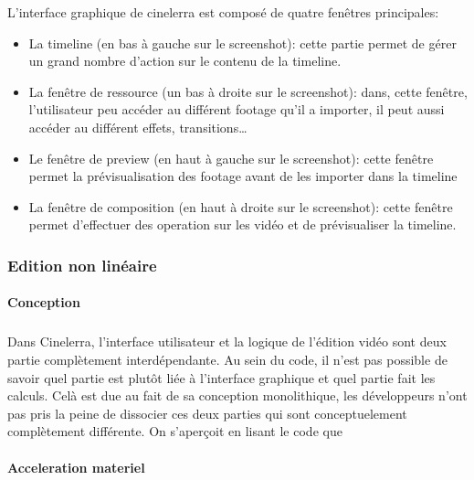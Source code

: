 L'interface graphique de cinelerra est composé de quatre fenêtres
principales:

\begin{itemize}
  \item {La timeline (en bas à gauche sur le screenshot): cette
    partie permet de gérer un grand nombre d'action sur le contenu de
    la timeline.}

  \item {La fenêtre de ressource (un bas à droite sur le screenshot):
    dans, cette fenêtre, l'utilisateur peu accéder au différent
    footage qu'il a importer, il peut aussi accéder au différent effets,
    transitions\ldots}

  \item {Le fenêtre de preview (en haut à gauche sur le screenshot):
    cette fenêtre permet la prévisualisation des footage avant de les
    importer dans la timeline}

  \item {La fenêtre de composition (en haut à droite sur le screenshot):
    cette fenêtre permet d'effectuer des operation sur les vidéo et
    de prévisualiser la timeline.}

\end{itemize}

\subsubsection{Edition non linéaire}

\paragraph{Conception}

\subparagraph{}

Dans Cinelerra, l'interface utilisateur et la logique de l'édition
vidéo sont deux partie complètement interdépendante. Au sein du
code, il n'est pas possible de savoir quel partie est plutôt liée à
l'interface graphique et quel partie fait les calculs. Celà est due au
fait de sa conception monolithique, les développeurs n'ont pas pris la
peine de dissocier ces deux parties qui sont conceptuelement complètement
différente. On s'aperçoit en lisant le code que

\paragraph{Acceleration materiel}

\subparagraph{}

